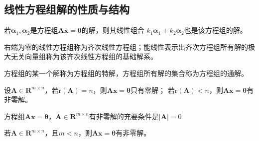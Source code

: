 \subsection{线性方程组解的性质与结构}
\begin{theorem}
    若$\boldsymbol{\alpha}_1,\boldsymbol{\alpha}_2$是方程组$\boldsymbol{A}\boldsymbol{x}=\boldsymbol{\theta}$的解，则其线性组合
    $k_1\boldsymbol{\alpha}_1+k_2\boldsymbol{\alpha}_2$也是该方程组的解。
\end{theorem}

\begin{definition}
    右端为零的线性方程组称为{\heiti 齐次线性方程组}；能线性表示出齐次方程组所有解的极大无关向量组称为该齐次线性方程组的{\heiti 基础解系}。
\end{definition}

\begin{definition}[方程组的特解、通解]
    方程组的某一个解称为方程组的{\heiti 特解}，方程组所有解的集合称为方程组的{\heiti 通解}。    
\end{definition}

\begin{theorem}
    设$\boldsymbol{A}\in \mathbf{R}^{m\times n}$，若$\mathrm{r}(\boldsymbol{A})=n$，则$\boldsymbol{A}\boldsymbol{x}=\boldsymbol{\theta}$只有零解；
    若$\mathrm{r}(\boldsymbol{A})<n$，则$\boldsymbol{A}\boldsymbol{x}=\boldsymbol{\theta}$有非零解。
\end{theorem}
\begin{remark}
    方程组$\boldsymbol{A}\boldsymbol{x}=\boldsymbol{\theta}$，$\boldsymbol{A}\in \mathbf{R}^{m\times n}$有非零解的充要条件是$|\boldsymbol{A}|=0$
\end{remark}
\begin{remark}
    若$\boldsymbol{A}\in \mathbf{R}^{m\times n}$，且$m<n$，则$\boldsymbol{A}\boldsymbol{x}=\boldsymbol{\theta}$有非零解。
\end{remark}

